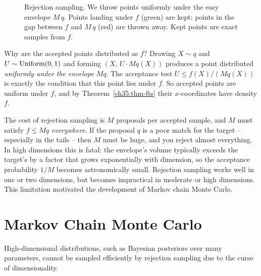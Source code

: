 \begin{figure}[H]
\centering
{}
\caption{Rejection sampling. We throw points uniformly under the easy envelope
$M\,q$. Points landing under $f$ (green) are kept; points in the gap between $f$
and $M\,q$ (red) are thrown away. Kept points are exact samples from $f$.}
\label{ch35:fig-rejection}
\end{figure}
\begin{whybox}
Why are the accepted points distributed as $f$? Drawing $X\sim q$ and
$U\sim\operatorname{Uniform}(0,1)$ and forming $(X,\,U\cdot M q(X))$ produces a point distributed
\emph{uniformly under the envelope} $Mq$. The acceptance test $U \le f(X)/(Mq(X))$
is exactly the condition that this point lies under $f$. So accepted points are
uniform under $f$, and by Theorem~\ref{ch35:thm-fts} their $x$-coordinates have
density $f$.
\end{whybox}
\begin{trapbox}
The cost of rejection sampling is $M$ proposals per accepted sample, and $M$ must
satisfy $f \le Mq$ \emph{everywhere}. If the proposal $q$ is a poor match for the
target -- especially in the tails -- then $M$ must be huge, and you reject almost
everything. In high dimensions this is fatal: the envelope's volume typically
exceeds the target's by a factor that grows exponentially with dimension, so the
acceptance probability $1/M$ becomes astronomically small. Rejection sampling
works well in one or two dimensions, but becomes impractical in moderate or high dimensions.
This limitation motivated the development of Markov chain Monte Carlo.
\end{trapbox}
\section{Markov Chain Monte Carlo}
\label{ch35:mcmc}
High-dimensional distributions, such as Bayesian posteriors over many parameters,
cannot be sampled efficiently by rejection sampling due to the curse of dimensionality.

